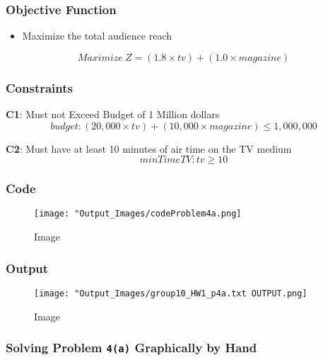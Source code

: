 \documentclass[
  12pt,
]{article}
\providecommand{\tightlist}{%
  \setlength{\itemsep}{0pt}\setlength{\parskip}{0pt}}
\begin{document}
\hypertarget{objective-function-1}{%
\subsubsection{Objective Function}\label{objective-function-1}}

\begin{itemize}
\tightlist
\item
  Maximize the total audience reach
\end{itemize}

\[
Maximize \ Z = (1.8\times tv) + (1.0 \times magazine)
\]

\hypertarget{constraints-1}{%
\subsubsection{Constraints}\label{constraints-1}}

\textbf{C1}: Must not Exceed Budget of 1 Million dollars\\
\[
budget: (20,000 \times tv) + (10,000 \times magazine) \leq 1,000,000
\]

\textbf{C2}: Must have at least 10 minutes of air time on the TV
medium\\
\[
minTimeTV: tv \geq 10
\]

\hypertarget{code-1}{%
\subsubsection{Code}\label{code-1}}

\begin{figure}
\centering
\texttt{[image: "Output\_Images/codeProblem4a.png]}
\caption{Image}
\end{figure}

\hypertarget{output-1}{%
\subsubsection{Output}\label{output-1}}

\begin{figure}
\centering
\texttt{[image: "Output\_Images/group10\_HW1\_p4a.txt OUTPUT.png]}
\caption{Image}
\end{figure}

\hypertarget{solving-problem-4a-graphically-by-hand}{%
\subsubsection{\texorpdfstring{Solving Problem \texttt{4(a)} Graphically
by
Hand}{Solving Problem 4(a) Graphically by Hand}}\label{solving-problem-4a-graphically-by-hand}}
\end{document}
